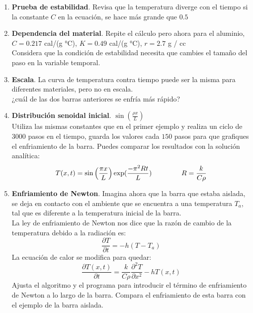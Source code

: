 \documentclass[12pt]{article}
\author{M. en C. Gustavo Contreras Mayén.}
\title{\begin{center}
Ejercicios EDP Parabólicas \\ Curso Física Computacional
\end{center}\end{large}}
\date{ }
\begin{document}
\maketitle
\fontsize{13}{13}\selectfont
\begin{enumerate}
\item \textbf{Prueba de estabilidad}. Revisa que la temperatura diverge con el tiempo si la constante $C$ en la ecuación, se hace más grande que $0.5$
\item \textbf{Dependencia del material}. Repite el cálculo pero ahora para el aluminio, $C=0.217$ cal/(g °C), $K=0.49$ cal/(g °C), $r = 2.7$ g / cc
\\
Considera que la condición de estabilidad necesita que cambies el tamaño del paso en la variable temporal.
\item \textbf{Escala}. La curva de temperatura contra tiempo puede ser la misma para diferentes materiales, pero no en escala.
\\
¿cuál de las dos barras anteriores se enfría más rápido?
\item \textbf{Distribución senoidal inicial}. $\sin(\frac{\rho x}{L})$
\\
Utiliza las mismas constantes que en el primer ejemplo y realiza un ciclo de $3000$ pasos en el tiempo, guarda los valores cada $150$ pasos para que grafiques el enfriamiento de la barra. Puedes comparar los resultados con la solución analítica:
\[ T(x,t) = \sin \left(\dfrac{\pi x}{L} \right) \exp(\frac{- \pi^{2} Rt}{L}) \hspace{1.5cm} R = \dfrac{k}{C \rho} \]
\item \textbf{Enfriamiento de Newton}. Imagina ahora que la barra que estaba aislada, se deja en contacto con el ambiente que se encuentra a una temperatura $T_{a}$, tal que es diferente a la temperatura inicial de la barra.
\\
La ley de enfriamiento de Newton nos dice que la razón de cambio de la temperatura debido a la radiación es:
\[ \dfrac{\partial T}{\partial t} = -h(T - T_{a}) \]
La ecuación de calor se modifica para quedar:
\[ \dfrac{\partial T(x,t)}{\partial t} = \dfrac{k}{C \rho} \dfrac{\partial^{2} T}{\partial x^{2}} - h T(x,t)\]
Ajusta el algoritmo y el programa para introducir el término de enfriamiento de Newton a lo largo de la barra. Compara el enfriamiento de esta barra con el ejemplo de la barra aislada.
\end{enumerate}
\end{document}
